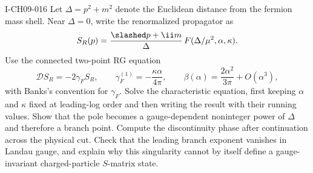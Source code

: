 \begin{exercise}{I-CH09-016}
Let $\Delta=p^2+m^2$ denote the Euclidean distance from the fermion mass shell.
Near $\Delta=0$, write the renormalized propagator as
\[
  S_R(p)=\frac{\slashed p+\ii m}{\Delta}\,F(\Delta/\mu^2,\alpha,\kappa).
\]
Use the connected two-point RG equation
\[
  \mathcal D S_R=-2\gamma_F S_R,
  \qquad
  \gamma_F^{(1)}=-\frac{\kappa\alpha}{4\pi},
  \qquad
  \beta(\alpha)=\frac{2\alpha^2}{3\pi}+O(\alpha^3),
\]
with Banks's convention for $\gamma_F$.  Solve the characteristic equation,
first keeping $\alpha$ and $\kappa$ fixed at leading-log order and then writing
the result with their running values.  Show that the pole becomes a
gauge-dependent noninteger power of $\Delta$ and therefore a branch point.
Compute the discontinuity phase after continuation across the physical cut.
Check that the leading branch exponent vanishes in Landau gauge, and explain
why this singularity cannot by itself define a gauge-invariant charged-particle
$S$-matrix state.
\end{exercise}

